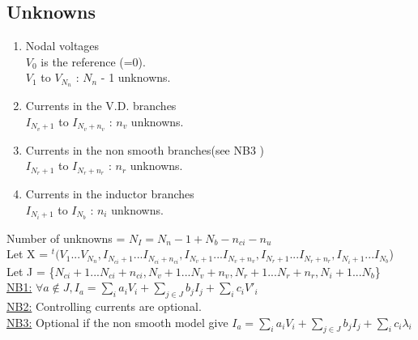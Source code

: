\documentclass[10pt]{article}
\begin{document}
\subsection{Unknowns\\}
\begin{enumerate}
\item Nodal voltages\\
$V_{0}$ is the reference (=0).\\
$V_{1}$ to $V_{N_{n}}$ : $N_{n}$ - 1 unknowns.
\item Currents in the V.D. branches\\
  $I_{N_{v}+1}$ to  $I_{N_{v} + n_{v}}$ : $n_{v}$ unknowns.
\item Currents in the non smooth branches(see NB3 )\\
  $I_{N_{r}+1}$ to  $I_{N_{r} + n_{r}}$ : $n_{r}$ unknowns.
\item Currents in the inductor branches\\
  $I_{N_{i}+1}$ to  $I_{N_{b} }$ : $n_{i}$ unknowns.

\end{enumerate}
Number of unknowns = $N_{I} = N_{n} - 1 + N_{b} - n_{ci} - n_{u}$\\
Let X = $^{t}(V_{1}...V_{N_{n}},I_{N_{ci}+1}...I_{N_{ci} + n_{ci}},I_{N_{v}+1}...I_{N_{v} + n_{v}},I_{N_{r}+1}...I_{N_{r} + n_{r}},I_{N_{i}+1}...I_{N_{b}}$)\\
Let J = \{$N_{ci}+1...N_{ci} + n_{ci},N_{v}+1...N_{v} + n_{v},N_{r}+1...N_{r} +n_{r},N_{i}+1...N_{b}$\}\\
\underline{NB1:} $\forall a \notin J, I_{a} = \sum_{i}^{}a_{i}V_{i} + \sum_{j\in J}^{}b_{j}I_{j}
+\sum_{i}^{}c_{i}V'_{i}$\\
\underline{NB2:} Controlling currents are optional.\\
\underline{NB3:} Optional if the non smooth model give $I_{a} = \sum_{i}^{}a_{i}V_{i} + \sum_{j\in J}^{}b_{j}I_{j} +\sum_{i}^{}c_{i}\lambda_{i} $
\newpage
\end{document}
